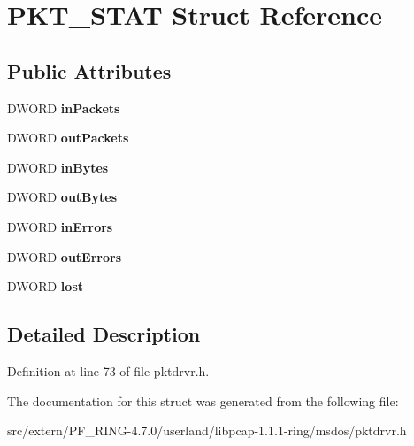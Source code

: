 \hypertarget{struct_p_k_t___s_t_a_t}{
\section{PKT\_\-STAT Struct Reference}
\label{struct_p_k_t___s_t_a_t}
}
\subsection*{Public Attributes}
\begin{DoxyCompactItemize}
\item 
\hypertarget{struct_p_k_t___s_t_a_t_a8fcb7b41888856afb545b9db320b0b0d}{
DWORD {\bfseries inPackets}}
\label{struct_p_k_t___s_t_a_t_a8fcb7b41888856afb545b9db320b0b0d}

\item 
\hypertarget{struct_p_k_t___s_t_a_t_a436c98f7ac5a26e51a3a0954fc5fdb5d}{
DWORD {\bfseries outPackets}}
\label{struct_p_k_t___s_t_a_t_a436c98f7ac5a26e51a3a0954fc5fdb5d}

\item 
\hypertarget{struct_p_k_t___s_t_a_t_a337e15b8aa53d0b57cfa029d35ff5773}{
DWORD {\bfseries inBytes}}
\label{struct_p_k_t___s_t_a_t_a337e15b8aa53d0b57cfa029d35ff5773}

\item 
\hypertarget{struct_p_k_t___s_t_a_t_ab963c49484ce99df1e104638afae9ea4}{
DWORD {\bfseries outBytes}}
\label{struct_p_k_t___s_t_a_t_ab963c49484ce99df1e104638afae9ea4}

\item 
\hypertarget{struct_p_k_t___s_t_a_t_a8b4693d297f5453aa43e8c59e23acc2a}{
DWORD {\bfseries inErrors}}
\label{struct_p_k_t___s_t_a_t_a8b4693d297f5453aa43e8c59e23acc2a}

\item 
\hypertarget{struct_p_k_t___s_t_a_t_aea71043aa83d0af84db5780bd89b0f57}{
DWORD {\bfseries outErrors}}
\label{struct_p_k_t___s_t_a_t_aea71043aa83d0af84db5780bd89b0f57}

\item 
\hypertarget{struct_p_k_t___s_t_a_t_a9c75d73e8fde68f2cb39e6c7e7332678}{
DWORD {\bfseries lost}}
\label{struct_p_k_t___s_t_a_t_a9c75d73e8fde68f2cb39e6c7e7332678}

\end{DoxyCompactItemize}


\subsection{Detailed Description}


Definition at line 73 of file pktdrvr.h.



The documentation for this struct was generated from the following file:\begin{DoxyCompactItemize}
\item 
src/extern/PF\_\-RING-\/4.7.0/userland/libpcap-\/1.1.1-\/ring/msdos/pktdrvr.h\end{DoxyCompactItemize}
